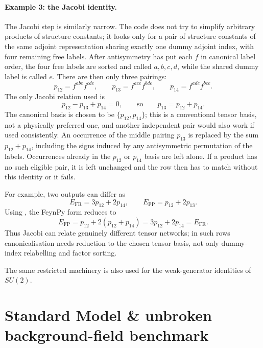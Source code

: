\paragraph{Example 3: the Jacobi identity.} The Jacobi step is similarly narrow. The code does not try to simplify arbitrary products of structure constants; it looks only for a pair of structure constants of the same adjoint representation sharing exactly one dummy adjoint index, with four remaining free labels. After antisymmetry has put each $f$ in canonical label order, the four free labels are sorted and called $a,b,c,d$, while the shared dummy label is called $e$. There are then only three pairings:
\[
    p_{12}=f^{abe}f^{cde}, \qquad
    p_{13}=f^{ace}f^{bde}, \qquad
    p_{14}=f^{ade}f^{bce}.
\]
The only Jacobi relation used is
\begin{equation}
    p_{12} - p_{13} + p_{14} = 0 ,
    \qquad\text{so}\qquad
    p_{13}=p_{12}+p_{14}.
    \label{eq:validation-jacobi}
\end{equation}
The canonical basis is chosen to be $\{p_{12},p_{14}\}$; this is a conventional tensor basis, not a physically preferred one, and another independent pair would also work if used consistently. An occurrence of the middle pairing $p_{13}$ is replaced by the sum $p_{12}+p_{14}$, including the signs induced by any antisymmetric permutation of the labels. Occurrences already in the $p_{12}$ or $p_{14}$ basis are left alone. If a product has no such eligible pair, it is left unchanged and the row then has to match without this identity or it fails.

For example, two outputs can differ as
\[
    E_{\mathrm{FR}}=3p_{12}+2p_{14},
    \qquad
    E_{\mathrm{FP}}=p_{12}+2p_{13}.
\]
Using , the FeynPy form reduces to
\[
    E_{\mathrm{FP}}
    =p_{12}+2(p_{12}+p_{14})
    =3p_{12}+2p_{14}
    =E_{\mathrm{FR}}.
\]
Thus Jacobi can relate genuinely different tensor networks; in such rows canonicalisation needs reduction to the chosen tensor basis, not only dummy-index relabelling and factor sorting.

The same restricted machinery is also used for the weak-generator identities of $SU(2)$.


\section{Standard Model \& unbroken background-field benchmark}
\label{sec:validation-sm}

